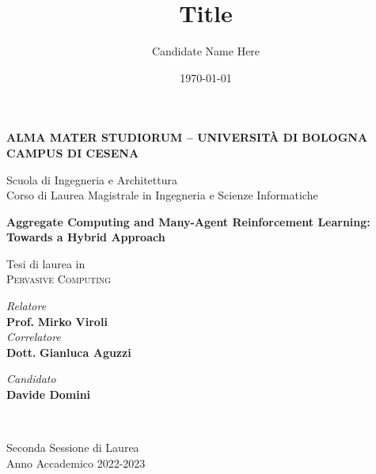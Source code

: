\title{Title}
\author{Candidate Name Here}
\date{\today}

\begin{titlepage}
	\begin{center}
		
		\large
		\textbf{ALMA MATER STUDIORUM -- UNIVERSITÀ DI BOLOGNA \\ CAMPUS DI CESENA}
		\\
		\noindent\hrulefill
		\vspace{0.4cm}
		
		\Large
		Scuola di Ingegneria e Architettura \\
		Corso di Laurea Magistrale in Ingegneria e Scienze Informatiche
		
		\Huge
		\vspace{4cm}
		\textbf{
			Aggregate Computing and Many-Agent Reinforcement Learning: 
			Towards a Hybrid Approach
		}
		
		\large
		\vspace{1cm}
		Tesi di laurea in 
		\\ 
		\textsc{Pervasive Computing}
		
		\vspace{5.5cm}
		\begin{minipage}[t]{0.64\textwidth}
			\begin{flushleft}
				\textit{Relatore} 
				\\ 
				\textbf{Prof.} \textbf{Mirko Viroli}
				\\
				\vspace{0.4cm}
				\textit{Correlatore} 
				\\
				\textbf{Dott.} \textbf{Gianluca Aguzzi}
			\end{flushleft}
		\end{minipage}
		\begin{minipage}[t]{0.34\textwidth}
			\begin{flushright}
				\textit{Candidato} 
				\\ 
				\textbf{Davide Domini}
			\end{flushright}
		\end{minipage}\\
		
		\vfill
		\noindent\hrulefill
		\vspace{0.3cm}
		\Large
		
		Seconda Sessione di Laurea
		\\
		Anno Accademico 2022-2023
	\end{center}
\end{titlepage}
\restoregeometry
